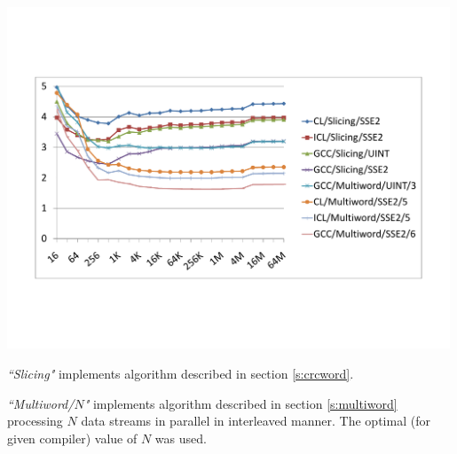 \documentclass{article}
\begin{document}
\begin{table}
\begin{center}
\includegraphics[trim=14.25mm 50mm 16.75mm 50mm, width=0.99\textwidth]{CRC128-full.pdf} \label{f:CRC128Perf}
\end{center}

{\it``Slicing"} implements algorithm described in section \ref{s:crcword}.

{\it``Multiword/$N$"} implements algorithm described in section
\ref{s:multiword} processing $N$ data streams in parallel in interleaved
manner. The optimal (for given compiler) value of $N$ was used.

\end{table}
\end{document}
